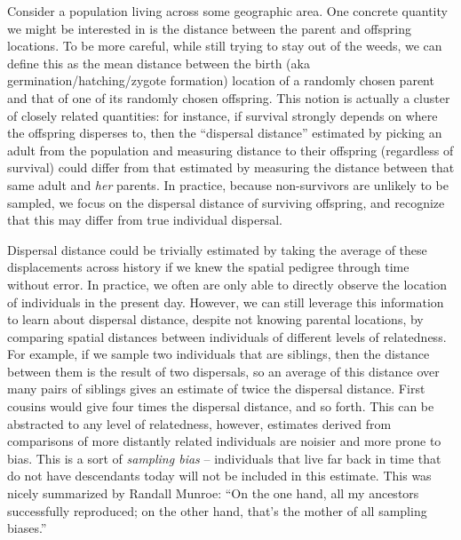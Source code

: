 \documentclass{ar-1col}
\begin{document}
Consider a population living across some geographic area.
One concrete quantity we might be interested in is
the distance between the parent and offspring locations.
To be more careful,
while still trying to stay out of the weeds,
we can define this as the mean distance between the
birth (aka germination/hatching/zygote formation)
location of a randomly chosen parent
and that of one of its randomly chosen offspring.
This notion is actually a cluster of closely related quantities:
for instance, if survival strongly depends on where the offspring disperses to,
then the ``dispersal distance'' estimated by picking an adult from the population
and measuring distance to their offspring (regardless of survival)
could differ from that estimated by measuring the distance between that same adult
and \textit{her} parents.
In practice, 
because non-survivors are unlikely to be sampled, 
we focus on the dispersal distance of surviving offspring, 
and recognize that this may differ from true individual dispersal.

Dispersal distance could be trivially estimated by taking
the average of these displacements across history
if we knew the spatial pedigree through time without error.
In practice, we often are only able to directly observe
the location of individuals in the present day.
However, we can still leverage this information to learn about dispersal distance,
despite not knowing parental locations, 
by comparing spatial distances between individuals of different levels of relatedness.
For example, if we sample two individuals that are siblings,
then the distance between them is the result of two dispersals,
so an average of this distance over many pairs of siblings gives an estimate of twice the dispersal distance.
First cousins would give four times the dispersal distance, and so forth.
This can be abstracted to any level of relatedness,
however, estimates derived from comparisons of more distantly related individuals
are noisier and more prone to bias.
This is a sort of \textit{sampling bias} --
individuals that live far back in time that do not have descendants today
will not be included in this estimate.
This was nicely summarized by Randall Munroe: 
``On the one hand, all my ancestors successfully reproduced; 
on the other hand, that's the mother of all sampling biases.''
\end{document}
